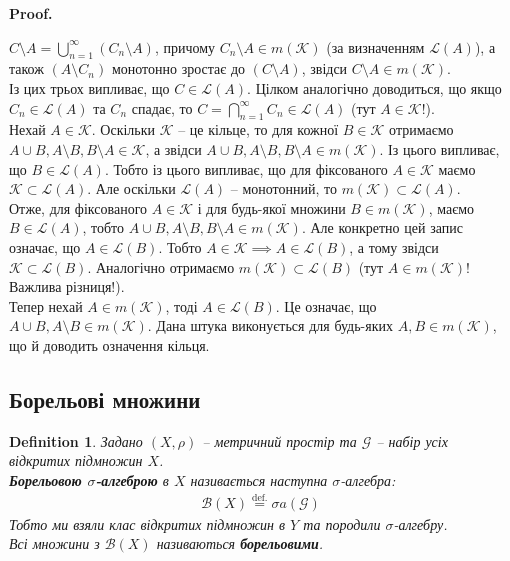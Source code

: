 \documentclass[a4paper, 10pt]{article}
\makeatletter
\theoremstyle{theoremdd}
\newtheorem{definition}[theorem]{Definition}
\renewenvironment{proof}[1][Proof.\\]{\par
\pushQED{\hfill \qed}%
\normalfont \topsep6\p@\@plus6\p@\relax
\trivlist
\item\relax
{\bfseries
#1\@addpunct{.}}\hspace\labelsep\ignorespaces
}{%
\popQED\endtrivlist\@endpefalse
}
\makeatother
\begin{document}
\begin{proof}
$C \setminus A = \displaystyle\bigcup_{n=1}^\infty (C_n \setminus A)$, причому $C_n \setminus A \in m(\mathcal{K})$ (за визначенням $\mathcal{L}(A)$), а також $(A \setminus C_n)$ монотонно зростає до $(C \setminus A)$, звідси $C \setminus A \in m(\mathcal{K})$.\\
Із цих трьох випливає, що $C \in \mathcal{L}(A)$. Цілком аналогічно доводиться, що якщо $C_n \in \mathcal{L}(A)$ та $C_n$ спадає, то $C = \displaystyle\bigcap_{n=1}^\infty C_n \in \mathcal{L}(A)$ (тут $A \in \mathcal{K}$!).\\
Нехай $A \in \mathcal{K}$. Оскільки $\mathcal{K}$ -- це кільце, то для кожної $B \in \mathcal{K}$ отримаємо $A \cup B, A \setminus B, B \setminus A \in \mathcal{K}$, а звідси $A \cup B, A \setminus B, B \setminus A \in m(\mathcal{K})$. Із цього випливає, що $B \in \mathcal{L}(A)$. Тобто із цього випливає, що для фіксованого $A \in \mathcal{K}$ маємо $\mathcal{K} \subset \mathcal{L}(A)$. Але оскільки $\mathcal{L}(A)$ -- монотонний, то $m (\mathcal{K}) \subset \mathcal{L}(A)$.\\
Отже, для фіксованого $A \in \mathcal{K}$ і для будь-якої множини $B \in m(\mathcal{K})$, маємо $B \in \mathcal{L}(A)$, тобто $A \cup B, A \setminus B, B \setminus A \in m(\mathcal{K})$. Але конкретно цей запис означає, що $A \in \mathcal{L}(B)$. Тобто $A \in \mathcal{K} \implies A \in \mathcal{L}(B)$, а тому звідси $\mathcal{K} \subset \mathcal{L}(B)$. Аналогічно отримаємо $m(\mathcal{K}) \subset \mathcal{L}(B)$ (тут $A \in m(\mathcal{K})$! Важлива різниця!).\\
Тепер нехай $A \in m(\mathcal{K})$, тоді $A \in \mathcal{L}(B)$. Це означає, що $A \cup B, A \setminus B \in m(\mathcal{K})$. Дана штука виконується для будь-яких $A,B \in m(\mathcal{K})$, що й доводить означення кільця.
\end{proof}

\subsection{Борельові множини}
\begin{definition}
Задано $(X,\rho)$ -- метричний простір та $\mathcal{G}$ -- набір усіх відкритих підмножин $X$.\\
\textbf{Борельовою $\sigma$-алгеброю} в $X$ називається наступна $\sigma$-алгебра:
\begin{align*}
\mathcal{B}(X) \overset{\text{def.}}{=} \sigma a(\mathcal{G})
\end{align*}
Тобто ми взяли клас відкритих підмножин в $Y$ та породили $\sigma$-алгебру.\\
Всі множини з $\mathcal{B}(X)$ називаються \textbf{борельовими}.
\end{definition}
\end{document}
